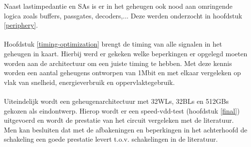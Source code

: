 Naast lastimpedantie en SAs is er in het geheugen ook nood aan omringende logica zoals buffers, passgates, decoders,... Deze werden onderzocht in hoofdstuk \ref{periphery}.\\\\
Hoofdstuk \ref{timing-optimization} brengt de timing van alle signalen in het geheugen in kaart. Hierbij werd er gekeken welke beperkingen er opgelegd moeten worden aan de architectuur om een juiste timing te hebben. Met deze kennis worden een aantal geheugens ontworpen van 1Mbit en met elkaar vergeleken op vlak van snelheid, energieverbruik en oppervlaktegebruik.\\\\
Uiteindelijk wordt een geheugenarchitectuur met 32WLs, 32BLs en 512GBs gekozen als eindontwerp. Hierop wordt er een speed-vdd-test (hoofdstuk \ref{final}) uitgevoerd en wordt de prestatie van het circuit vergeleken met de literatuur. Men kan besluiten dat met de afbakeningen en beperkingen in het achterhoofd de schakeling een goede prestatie levert t.o.v. schakelingen in de literatuur.
